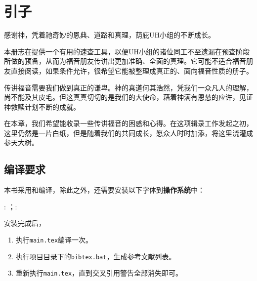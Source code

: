 \documentclass[Chinese,inNight]{CKBib}
\begin{document}
\clearpage

\thispagestyle{ruled}
\pagestyle{ruled}
\mainmatter

\chapter*{\chapFont 引子}


感谢神，凭着祂奇妙的恩典、道路和真理，荫庇UH小组的不断成长。

本册志在提供一个有用的速查工具，以便UH小组的诸位同工不至遗漏在预查阶段所做的预备，从而为福音朋友传讲出更加准确、全面的真理。它可能不适合福音朋友直接阅读，如果条件允许，很希望它能被整理成真正的、面向福音性质的册子。

传讲福音需要我们做到真正的谦卑。神的真道何其浩然，凭我们一众凡人的理解，尚不能及其皮毛。但这真真切切的是我们的大使命，藉着神满有恩慈的应许，见证神救赎计划不断的成就。

在本章，我们希望能收录一些传讲福音的困惑和心得。在这项辑录工作发起之初，这里仍然是一片白纸，但是随着我们的共同成长，愿众人时时加添，将这里浇灌成参天大树。

\section*{编译要求}

本书采用{\LaTeXe}和{\XeTeX}编译，除此之外，还需要安装以下字体到\textbf{操作系统}中：

\normalfont\selectfont: \href{https://blog.typekit.com/alternate/source-han-sans-chs/}{\Mundus}；\normalfont\selectfont: \href{https://source.typekit.com/source-han-serif/cn/}{\Mundus}

安装完成后，

\begin{enumerate}
  \item 执行\texttt{main.tex}编译一次。
  \item 执行项目目录下的\texttt{bibtex.bat}，生成参考文献列表。
  \item 重新执行\texttt{main.tex}，直到交叉引用警告全部消失即可。
\end{enumerate}
\end{document}

